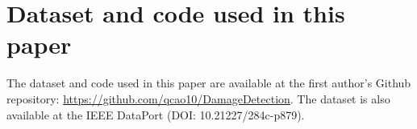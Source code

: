 \documentclass[journal, 12pt, onecolumn,draftclsnofoot]{IEEEtran}
\begin{document}
\section{Dataset and code used in this paper}
The dataset and code used in this paper are available at the first author's Github repository: \url{https://github.com/qcao10/DamageDetection}. The dataset is also available at the IEEE DataPort (DOI: 10.21227/284c-p879).\\





\ifCLASSOPTIONcaptionsoff
  \newpage
\fi







%



% 
\end{document}
